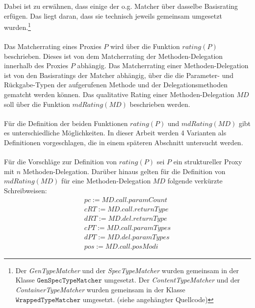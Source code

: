 \documentclass[a4paper,12pt]{article}
\begin{document}
Dabei ist zu erwähnen, dass einige der o.g. Matcher über dasselbe Basisrating erfügen. Das liegt daran, dass sie technisch jeweils gemeinsam umgesetzt wurden.\footnote{Der \emph{GenTypeMatcher} und der \emph{SpecTypeMatcher} wurden gemeinsam in der Klasse $\texttt{GenSpecTypeMatcher}$ umgesetzt. Der \emph{ContentTypeMatcher} und der \emph{ContainerTypeMatcher} wurden gemeinsam in der Klasse $\texttt{WrappedTypeMatcher}$ umgesetzt. (siehe angehängter Quellcode)}\\\\
Das Matcherrating eines Proxies $P$ wird über die Funktion $\mathit{rating(P)}$ beschrieben. Dieses ist von dem Matcherrating der Methoden-Delegation innerhalb des Proxies $P$ abhängig. Das Matcherrating einer Methoden-Delegation ist von den Basisratings der Matcher abhängig, über die die Parameter- und Rückgabe-Typen der aufgerufenen Methode und der Delegationsmethoden gematcht werden können. Das qualitative Rating einer Methoden-Delegation $\mathit{MD}$ soll über die Funktion $\mathit{mdRating(MD)}$ beschrieben werden.\\\\
Für die Definition der beiden Funktionen $\mathit{rating(P)}$ und $\mathit{mdRating(MD)}$ gibt es unterschiedliche Möglichkeiten. In dieser Arbeit werden 4 Varianten als Definitionen vorgeschlagen, die in einem späteren Abschnitt untersucht werden.\\\\
Für die Vorschläge zur Definition von $\mathit{rating(P)}$ sei $P$ ein struktureller Proxy mit $n$ Methoden-Delegation.
Darüber hinaus gelten für die Definition von $\mathit{mdRating(MD)}$ für eine Methoden-Delegation $\mathit{MD}$ folgende verkürzte Schreibweisen:
\begin{gather*}
	\mathit{pc} := \mathit{MD.call.paramCount}
	\\
	\mathit{cRT} := \mathit{MD.call.returnType}
	\\
	\mathit{dRT} := \mathit{MD.del.returnType}
	\\
	\mathit{cPT} := \mathit{MD.call.paramTypes}
	\\
	\mathit{dPT} := \mathit{MD.del.paramTypes}
	\\
	\mathit{pos} := \mathit{MD.call.posModi}
\end{gather*}
\end{document}
